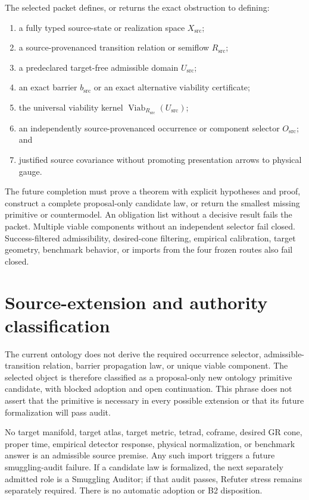 \documentclass[11pt]{article}
\newcommand{\Xsrc}{X_{\mathrm{src}}}
\newcommand{\Rsrc}{R_{\mathrm{src}}}
\newcommand{\Usrc}{U_{\mathrm{src}}}
\newcommand{\bsrc}{b_{\mathrm{src}}}
\newcommand{\Osrc}{O_{\mathrm{src}}}
\newcommand{\Viab}{\operatorname{Viab}}
\newcommand{\status}[1]{\textsf{#1}}
\begin{document}
The selected packet defines, or returns the exact obstruction to defining:
\begin{enumerate}
  \item a fully typed source-state or realization space $\Xsrc$;
  \item a source-provenanced transition relation or semiflow $\Rsrc$;
  \item a predeclared target-free admissible domain $\Usrc$;
  \item an exact barrier $\bsrc$ or an exact alternative viability
        certificate;
  \item the universal viability kernel $\Viab_{\Rsrc}(\Usrc)$;
  \item an independently source-provenanced occurrence or component selector
        $\Osrc$; and
  \item justified source covariance without promoting presentation arrows to
        physical gauge.
\end{enumerate}

The future completion must prove a theorem with explicit hypotheses and proof,
construct a complete proposal-only candidate law, or return the smallest
missing primitive or countermodel.  An obligation list without a decisive
result fails the packet.  Multiple viable components without an independent
selector fail closed.  Success-filtered admissibility, desired-cone filtering,
empirical calibration, target geometry, benchmark behavior, or imports from
the four frozen routes also fail closed.

\section{Source-extension and authority classification}

The current ontology does not derive the required occurrence selector,
admissible-transition relation, barrier propagation law, or unique viable
component.  The selected object is therefore classified as a
\status{proposal-only new ontology primitive candidate}, with
\status{blocked adoption and open continuation}.  This phrase does not assert
that the primitive is necessary in every possible extension or that its
future formalization will pass audit.

No target manifold, target atlas, target metric, tetrad, coframe, desired GR
cone, proper time, empirical detector response, physical normalization, or
benchmark answer is an admissible source premise.  Any such import triggers a
future smuggling-audit failure.  If a candidate law is formalized, the next
separately admitted role is a Smuggling Auditor; if that audit passes, Refuter
stress remains separately required.  There is no automatic adoption or B2
disposition.
\end{document}
